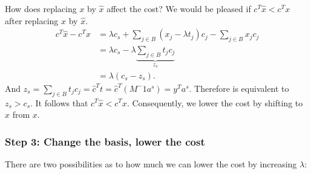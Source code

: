 How does replacing $x$ by $\hat{x}$ affect the cost?
We would be pleased if $c^T \hat{x} < c^T x$ after replacing $x$ by $\hat{x}$.
\begin{align}
c^T \hat{x} - c^T x 
&= \lambda c_s + \sum _{j \in B} (x_j - \lambda t_j) c_j - \sum _{j \in B} x_j c_j \\
&= \lambda c_s - \lambda \underbrace{\sum _{j \in B} t_j c_j}_{z_s} \\
&= \lambda (c_s - z_s).
\end{align}
And $z_s = \sum _{j \in B} t_j c_j = \hat{c}^T t = \hat{c}^T (M^-1 a^s) = y^T a^s$.
Therefore   is equivalent to $z_s > c_s$.
It follows that $c^T \hat{x} < c^T x$.
Consequently, we lower the cost by shifting to $\hat{x}$ from $x$.

\subsubsection{Step 3: Change the basis, lower the cost}

There are two possibilities as to how much we can lower the cost by increasing $\lambda$:

